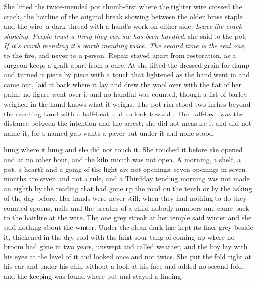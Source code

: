 She lifted the twice-mended pot thumb-first where the tighter wire crossed the crack, the hairline of the original break showing between the older brass staple and the wire, a dark thread with a hand's work on either side. \emph{Leave the crack showing. People trust a thing they can see has been handled}, she said to the pot; \emph{If it's worth mending it's worth mending twice. The second time is the real one}, to the fire, and never to a person. Repair stayed apart from restoration, as a surgeon keeps a graft apart from a cure. At  she lifted the dressed grain for damp and turned it piece by piece with a touch that lightened as the hand went in and came out, laid it back where it lay and drew the wool over with the flat of her palm; no figure went over it and no handful was counted, though a fist of barley weighed in the hand knows what it weighs. The pot rim stood two inches beyond the reaching hand with a half-beat and no look toward . The half-beat was the distance between the intention and the arrest; she did not measure it and did not name it, for a named gap wants a payer put under it and none stood.

 hung where it hung and she did not touch it. She touched it before she opened  and at no other hour, and the kiln mouth was not open. A morning, a shelf, a pot, a hearth and a going of the light are not openings; seven openings in seven months are seven and not a rule, and a Thirdday tending morning was not made an eighth by the reading that had gone up the road on the tenth or by the asking of the day before. Her hands were never still; when they had nothing to do they counted spoons, nails and the breaths of a child nobody numbers and came back to the hairline at the wire. The one grey streak at her temple said winter and she said nothing about the winter. Under  the clean dark line kept its finer grey beside it, thickened in the dry cold with the faint sour tang of  coming up where no broom had gone in two years, unswept and called weather, and the boy lay with his eyes at the level of it and looked once and not twice. She put the fold right at his ear and under his chin without a look at his face and added no second fold, and the keeping was found where put and stayed a finding.

\scenebreak

